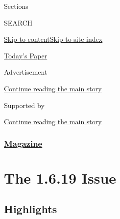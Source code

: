 Sections

SEARCH

\protect\hyperlink{site-content}{Skip to
content}\protect\hyperlink{site-index}{Skip to site index}

\href{https://myaccount.nytimes3xbfgragh.onion/auth/login?response_type=cookie\&client_id=vi}{}

\href{https://www.nytimes3xbfgragh.onion/section/todayspaper}{Today's
Paper}

Advertisement

\protect\hyperlink{after-top}{Continue reading the main story}

Supported by

\protect\hyperlink{after-sponsor}{Continue reading the main story}

\hypertarget{magazine}{%
\subsubsection{\texorpdfstring{\href{/section/magazine}{Magazine}}{Magazine}}\label{magazine}}

\hypertarget{the-1619-issue}{%
\section{The 1.6.19 Issue}\label{the-1619-issue}}

\hypertarget{highlights}{%
\subsection{Highlights}\label{highlights}}

